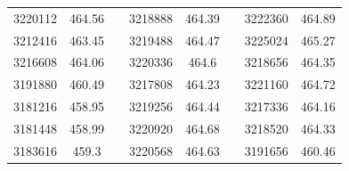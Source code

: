 \documentclass[12pt]{mwart}
\begin{document}
\begin{table}[H]
\begin{tabular}{cclcclcc}
		3220112                                                  & 464.56                                                        &  & 3218888                                                  & 464.39                                                        &  & 3222360                                                  & 464.89                                                        \\
		3212416                                                  & 463.45                                                        &  & 3219488                                                  & 464.47                                                        &  & 3225024                                                  & 465.27                                                        \\
		3216608                                                  & 464.06                                                        &  & 3220336                                                  & 464.6                                                         &  & 3218656                                                  & 464.35                                                        \\
		3191880                                                  & 460.49                                                        &  & 3217808                                                  & 464.23                                                        &  & 3221160                                                  & 464.72                                                        \\
		3181216                                                  & 458.95                                                        &  & 3219256                                                  & 464.44                                                        &  & 3217336                                                  & 464.16                                                        \\
		3181448                                                  & 458.99                                                        &  & 3220920                                                  & 464.68                                                        &  & 3218520                                                  & 464.33                                                        \\
		3183616                                                  & 459.3                                                         &  & 3220568                                                  & 464.63                                                        &  & 3191656                                                  & 460.46                                                        \\

\end{tabular}
\end{table}
\end{document}
